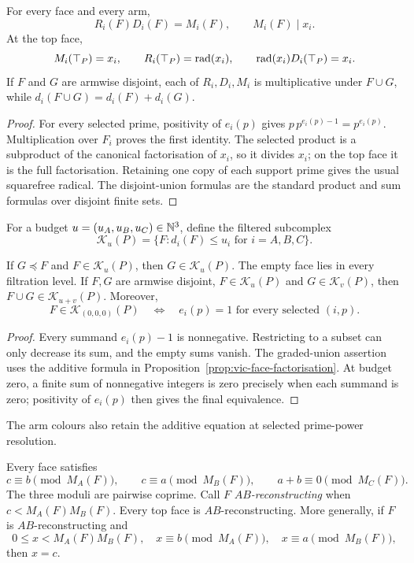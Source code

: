 \begin{proposition}\label{prop:vic-face-factorisation}
For every face and every arm,
\[
 R_i(F)D_i(F)=M_i(F),\qquad M_i(F)\mid x_i.
\]
At the top face,
\[
 M_i(\top_P)=x_i,\qquad R_i(\top_P)=\operatorname{rad}(x_i),
 \qquad \operatorname{rad}(x_i)D_i(\top_P)=x_i.
\]
If $F$ and $G$ are armwise disjoint, each of $R_i,D_i,M_i$ is multiplicative
under $F\cup G$, while $d_i(F\cup G)=d_i(F)+d_i(G)$.
\end{proposition}

\begin{proof}
For every selected prime, positivity of $e_i(p)$ gives
$p\,p^{e_i(p)-1}=p^{e_i(p)}$.  Multiplication over $F_i$ proves the first
identity.  The selected product is a subproduct of the canonical
factorisation of $x_i$, so it divides $x_i$; on the top face it is the full
factorisation.  Retaining one copy of each support prime gives the usual
squarefree radical.  The disjoint-union formulas are the standard product and
sum formulas over disjoint finite sets.
\end{proof}

For a budget $u=(u_A,u_B,u_C)\in\mathbb N^3$, define the filtered subcomplex
\[
 \mathcal K_u(P)=\{F:d_i(F)\le u_i\text{ for }i=A,B,C\}.
\]

\begin{proposition}\label{prop:vic-filtration}
If $G\preceq F$ and $F\in\mathcal K_u(P)$, then
$G\in\mathcal K_u(P)$.  The empty face lies in every filtration level.  If
$F,G$ are armwise disjoint, $F\in\mathcal K_u(P)$ and
$G\in\mathcal K_v(P)$, then $F\cup G\in\mathcal K_{u+v}(P)$.  Moreover,
\[
 F\in\mathcal K_{(0,0,0)}(P)
 \quad\Longleftrightarrow\quad
 e_i(p)=1\text{ for every selected }(i,p).
\]
\end{proposition}

\begin{proof}
Every summand $e_i(p)-1$ is nonnegative.  Restricting to a subset can only
decrease its sum, and the empty sums vanish.  The graded-union assertion uses
the additive formula in Proposition~\ref{prop:vic-face-factorisation}.  At
budget zero, a finite sum of nonnegative integers is zero precisely when each
summand is zero; positivity of $e_i(p)$ then gives the final equivalence.
\end{proof}

The arm colours also retain the additive equation at selected prime-power
resolution.

\begin{proposition}
Every face satisfies
\[
 c\equiv b\pmod{M_A(F)},\qquad
 c\equiv a\pmod{M_B(F)},\qquad
 a+b\equiv0\pmod{M_C(F)}.
\]
The three moduli are pairwise coprime.  Call $F$ \emph{$AB$-reconstructing}
when $c<M_A(F)M_B(F)$.  Every top face is $AB$-reconstructing.  More
generally, if $F$ is $AB$-reconstructing and
\[
 0\le x<M_A(F)M_B(F),\quad
 x\equiv b\pmod{M_A(F)},\quad x\equiv a\pmod{M_B(F)},
\]
then $x=c$.
\end{proposition}

